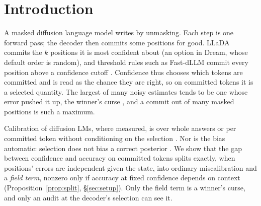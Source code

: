 %
%

\section{Introduction}
\label{sec:intro}

A masked diffusion language model writes by unmasking. Each step is one forward pass; the decoder
then commits some positions for good. LLaDA commits the $k$ positions it is most confident
about (an option in Dream, whose default order is random), and threshold rules such as Fast-dLLM commit every position above a
confidence cutoff \citep{nie2025llada,ye2025dream,chang2022maskgit,wu2025fastdllm}.
Confidence thus chooses which tokens are committed and is read as the chance they are
right, so on committed tokens it is a selected quantity. The largest of many noisy estimates
tends to be one whose error pushed it up, the winner's curse \citep{andrews2024winners}, and
a commit out of many masked positions is such a maximum.

Calibration of diffusion LMs, where measured, is over whole answers
\citep{yadav2026bidirectional,jiang2026bayeser} or per committed token without conditioning on
the selection \citep{asaria2026diffusiongemma}. Nor is the bias automatic: selection does not bias a correct posterior
\citep{dawid1994selection,efron2011tweedie}. We show that the gap between confidence and accuracy on committed
tokens splits exactly, when positions' errors are independent given the state, into ordinary
miscalibration and a \emph{field term}, nonzero only if
accuracy at fixed confidence depends on context (Proposition~\ref{prop:split},
\S\ref{sec:setup}). Only the field term is a winner's curse, and only an audit at the
decoder's selection can see it.

